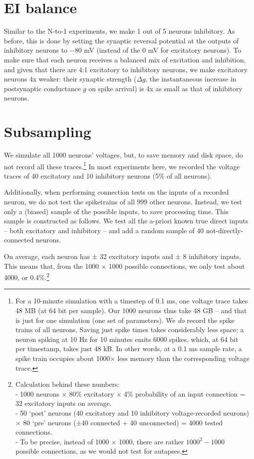 \section{EI balance}

Similar to the N-to-1 experiments, we make 1 out of 5 neurons inhibitory.
As before, this is done by setting the synaptic reversal potential at the outputs of inhibitory neurons to $-80$ mV (instead of the $0$ mV for excitatory neurons).
To make sure that each neuron receives a balanced mix of excitation and inhibition, and given that there are 4:1 excitatory to inhibitory neurons, we make excitatory neurons 4x weaker: their synaptic strength ($Δg$, the instantaneous increase in postsynaptic conductance $g$ on spike arrival) is 4x as small as that of inhibitory neurons.



\section{Subsampling}

We simulate all 1000 neurons' voltages, but, to save memory and disk space,  do not record all these traces.\footnote{
    For a 10-minute simulation with a timestep of 0.1 ms, one voltage trace takes 48 MB (at 64 bit per sample). Our 1000 neurons thus take 48 GB -- and that is just for one simulation (one set of parameters).\newline
    We \emph{do} record the spike trains of all neurons. Saving just spike times takes considerably less space: a neuron spiking at 10 Hz for 10 minutes emits 6000 spikes, which, at 64 bit per timestamp, takes just  48 kB.\newline
    In other words,  at a 0.1 ms sample rate, a spike train occupies about 1000× less memory than the corresponding voltage trace.
}
In most experiments here, we recorded the voltage traces of 40 excitatory and 10 inhibitory neurons (5\% of all neurons).

Additionally, when performing connection tests on the inputs of a recorded neuron, we do not test the spiketrains of all 999 other neurons. Instead, we test only a (biased) sample of the possible inputs, to save processing time.
This sample is constructed as follows. We test all the a-priori known true direct inputs -- both excitatory and inhibitory -- and add a random sample of 40 not-directly-connected neurons.

On average, each neuron has ± 32 excitatory inputs and ± 8 inhibitory inputs. This means that, from the 1000 × 1000 possible connections, we only test about 4000, or 0.4\%.\footnote{
    Calculation behind these numbers:\\
    - 1000 neurons × 80\% excitatory × 4\% probability of an input connection = 32 excitatory inputs on average.\\
    - 50 `post' neurons (40 excitatory and 10 inhibitory voltage-recorded neurons) × 80 `pre' neurons (±40 connected + 40 unconnected) = 4000 tested connections.\\
    - To be precise, instead of 1000 × 1000, there are rather  $1000^2 - 1000$ possible connections, as we would not test for autapses.
}

